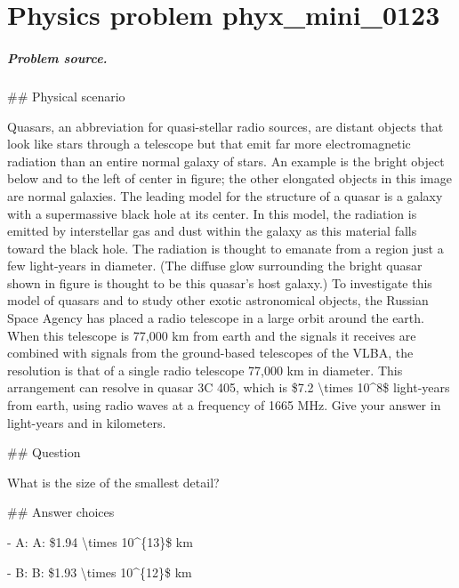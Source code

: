 
\chapter{Physics problem phyx\_mini\_0123}
\label{ch:PhyXMiniProblems_problem_phyx_mini_0123}

\paragraph{Problem source.}
\#\# Physical scenario

Quasars, an abbreviation for quasi-stellar radio sources, are distant objects that look like stars through a telescope but that emit far more electromagnetic radiation than an entire normal galaxy of stars. An example is the bright object below and to the left of center in figure; the other elongated objects in this image are normal galaxies. The leading model for the structure of a quasar is a galaxy with a supermassive black hole at its center. In this model, the radiation is emitted by interstellar gas and dust within the galaxy as this material falls toward the black hole. The radiation is thought to emanate from a region just a few light-years in diameter. (The diffuse glow surrounding the bright quasar shown in figure is thought to be this quasar's host galaxy.) To investigate this model of quasars and to study other exotic astronomical objects, the Russian Space Agency has placed a radio telescope in a large orbit around the earth. When this telescope is 77,000 km from earth and the signals it receives are combined with signals from the ground-based telescopes of the VLBA, the resolution is that of a single radio telescope 77,000 km in diameter. This arrangement can resolve in quasar 3C 405, which is \$7.2 \textbackslash{}times 10\textasciicircum{}8\$ light-years from earth, using radio waves at a frequency of 1665 MHz. Give your answer in light-years and in kilometers.

\#\# Question

What is the size of the smallest detail?

\#\# Answer choices

- A: A: \$1.94 \textbackslash{}times 10\textasciicircum{}\{13\}\$ km

- B: B: \$1.93 \textbackslash{}times 10\textasciicircum{}\{12\}\$ km

